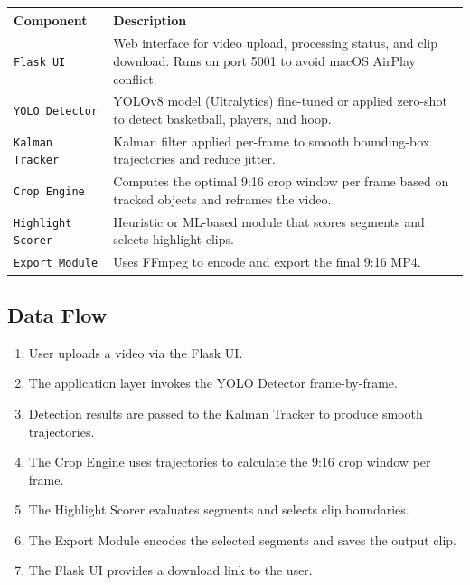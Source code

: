 \documentclass[12pt]{article}
\begin{document}
\begin{tabularx}{\textwidth}{|l|X|}
    \hline
    \textbf{Component} & \textbf{Description} \\
    \hline
    \texttt{Flask UI} & Web interface for video upload, processing status, and
                        clip download. Runs on port 5001 to avoid macOS AirPlay conflict. \\
    \hline
    \texttt{YOLO Detector} & YOLOv8 model (Ultralytics) fine-tuned or applied
                              zero-shot to detect basketball, players, and hoop. \\
    \hline
    \texttt{Kalman Tracker} & Kalman filter applied per-frame to smooth
                               bounding-box trajectories and reduce jitter. \\
    \hline
    \texttt{Crop Engine} & Computes the optimal 9:16 crop window per frame
                           based on tracked objects and reframes the video. \\
    \hline
    \texttt{Highlight Scorer} & Heuristic or ML-based module that scores segments
                                 and selects highlight clips. \\
    \hline
    \texttt{Export Module} & Uses FFmpeg to encode and export the final 9:16 MP4. \\
    \hline
\end{tabularx}

\subsection{Data Flow}
\begin{enumerate}[noitemsep]
    \item User uploads a video via the Flask UI.
    \item The application layer invokes the YOLO Detector frame-by-frame.
    \item Detection results are passed to the Kalman Tracker to produce smooth trajectories.
    \item The Crop Engine uses trajectories to calculate the 9:16 crop window per frame.
    \item The Highlight Scorer evaluates segments and selects clip boundaries.
    \item The Export Module encodes the selected segments and saves the output clip.
    \item The Flask UI provides a download link to the user.
\end{enumerate}
\end{document}
